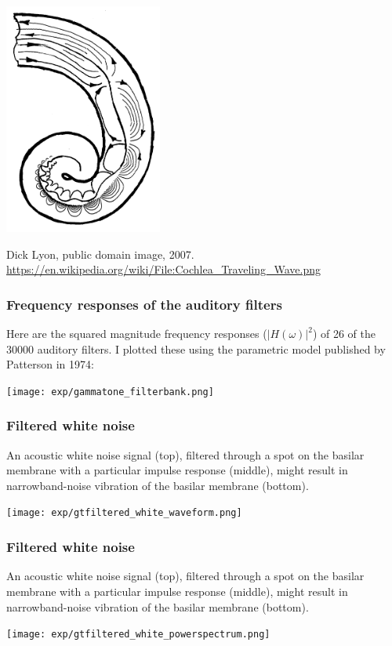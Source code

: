 \documentclass{beamer}
\begin{document}
\begin{frame}
  \centerline{\includegraphics[height=3in]{Cochlea_Traveling_Wave.png}}
  \begin{tiny}
    Dick Lyon, public domain image, 2007.
    \url{https://en.wikipedia.org/wiki/File:Cochlea_Traveling_Wave.png}
  \end{tiny}
\end{frame}

\begin{frame}
  \frametitle{Frequency responses of the auditory filters}

  Here are the squared magnitude frequency responses ($|H(\omega)|^2$)
  of 26 of the 30000 auditory filters. I plotted these using the
  parametric model published by Patterson in 1974:
  \centerline{\texttt{[image: exp/gammatone\_filterbank.png]}}
\end{frame}
     
\begin{frame}
  \frametitle{Filtered white noise}

  An acoustic white  noise signal (top), filtered through a spot on the
  basilar membrane with a particular impulse response (middle), might result in
  narrowband-noise  vibration of the basilar membrane (bottom).
  \centerline{\texttt{[image: exp/gtfiltered\_white\_waveform.png]}}
\end{frame}
     
\begin{frame}
  \frametitle{Filtered white noise}

  An acoustic white  noise signal (top), filtered through a spot on the
  basilar membrane with a particular impulse response (middle), might result in
  narrowband-noise  vibration of the basilar membrane (bottom).
  \centerline{\texttt{[image: exp/gtfiltered\_white\_powerspectrum.png]}}
\end{frame}
     
\end{document}
